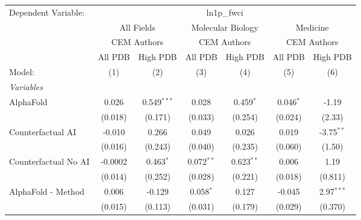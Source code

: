 \begingroup
\centering
\begin{tabular}{lcccccc}
   \tabularnewline \midrule \midrule
   Dependent Variable: & \multicolumn{6}{c}{ln1p\_fwci}\\
 & \multicolumn{2}{c}{All Fields} & \multicolumn{2}{c}{Molecular Biology} & \multicolumn{2}{c}{Medicine} \\
\cmidrule(lr){2-3} \cmidrule(lr){4-5} \cmidrule(lr){6-7}
 & \multicolumn{2}{c}{CEM Authors} & \multicolumn{2}{c}{CEM Authors} & \multicolumn{2}{c}{CEM Authors} \\
\cmidrule(lr){2-3} \cmidrule(lr){4-5} \cmidrule(lr){6-7}
 & \multicolumn{1}{c}{All PDB} & \multicolumn{1}{c}{High PDB} & \multicolumn{1}{c}{All PDB} & \multicolumn{1}{c}{High PDB} & \multicolumn{1}{c}{All PDB} & \multicolumn{1}{c}{High PDB} \\
\cmidrule(lr){2-2} \cmidrule(lr){3-3} \cmidrule(lr){4-4} \cmidrule(lr){5-5} \cmidrule(lr){6-6} \cmidrule(lr){7-7}
   Model:                                                     & (1)     & (2)           & (3)            & (4)          & (5)           & (6)\\  
   \midrule
   \emph{Variables}\\
   AlphaFold                                                  & 0.026   & 0.549$^{***}$ & 0.028          & 0.459$^{*}$  & 0.046$^{*}$   & -1.19\\   
                                                              & (0.018) & (0.171)       & (0.033)        & (0.254)      & (0.024)       & (2.33)\\   
   Counterfactual AI                                          & -0.010  & 0.266         & 0.049          & 0.026        & 0.019         & -3.75$^{**}$\\   
                                                              & (0.016) & (0.243)       & (0.040)        & (0.235)      & (0.060)       & (1.50)\\   
   Counterfactual No AI                                       & -0.0002 & 0.463$^{*}$   & 0.072$^{**}$   & 0.623$^{**}$ & 0.006         & 1.19\\   
                                                              & (0.014) & (0.252)       & (0.028)        & (0.221)      & (0.018)       & (0.811)\\   
   AlphaFold - Method                                         & 0.006   & -0.129        & 0.058$^{*}$    & 0.127        & -0.045        & 2.97$^{***}$\\   
                                                              & (0.015) & (0.113)       & (0.031)        & (0.179)      & (0.029)       & (0.370)\\   

\end{tabular}
